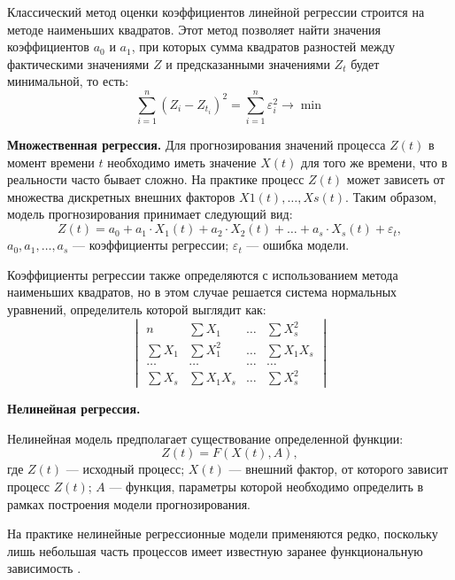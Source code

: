 \documentclass[a4paper,14pt, unknownkeysallowed]{extreport}
\begin{document}
	Классический метод оценки коэффициентов линейной регрессии строится на методе наименьших квадратов. 
	Этот метод позволяет найти значения коэффициентов $a_0$ и $a_1$, при которых сумма квадратов разностей между фактическими значениями $Z$ и предсказанными значениями $Z_t$ будет минимальной, то есть:
	\begin{equation}
		\sum_{i = 1}^{n}(Z_i - Z_{t_i})^2 = \sum_{i = 1}^{n}\varepsilon_i^2 \rightarrow \min
	\end{equation}
	
	\textbf{Множественная регрессия.}
	Для прогнозирования значений процесса $Z(t)$ в момент времени $t$ необходимо иметь значение $X(t)$ для того же времени, что в реальности часто бывает сложно. На практике процесс $Z(t)$ может зависеть от множества дискретных внешних факторов $X1(t),\dots,Xs(t)$. Таким образом, модель прогнозирования принимает следующий вид:
	\begin{equation}
		Z(t) = a_0 + a_1 \cdot X_1(t) + a_2 \cdot X_2(t) + \dots + a_s \cdot X_s(t) + \varepsilon_t,
	\end{equation}
	$a_0, a_1, \dots, a_s$ --- коэффициенты регрессии; $\varepsilon_t$ --- ошибка модели.
	
	
	Коэффициенты регрессии также определяются с использованием метода наименьших квадратов, но в этом случае решается система нормальных уравнений, определитель которой выглядит как:
	\begin{equation}
		\begin{vmatrix}
			n & \sum X_1 & \dots & \sum X_s^2 \\
			\sum X_1 & \sum X_1^2 & \dots & \sum X_1X_s \\
			\dots & \dots & \dots & \dots \\
			\sum X_s & \sum X_1X_s & \dots & \sum X_s^2
		\end{vmatrix}
	\end{equation}
	
	\textbf{Нелинейная регрессия.}
	
	Нелинейная модель предполагает существование определенной функции:
	\begin{equation}
		Z(t) = F(X(t), A),
	\end{equation}
	где $Z(t)$ --- исходный процесс; $X(t)$ --- внешний фактор, от которого зависит процесс $Z(t)$; $A$ --- функция, параметры которой необходимо определить в рамках построения модели прогнозирования.
	
	На практике нелинейные регрессионные модели применяются редко, поскольку лишь небольшая часть процессов имеет известную заранее функциональную зависимость \cite{3}.
	
\end{document}
